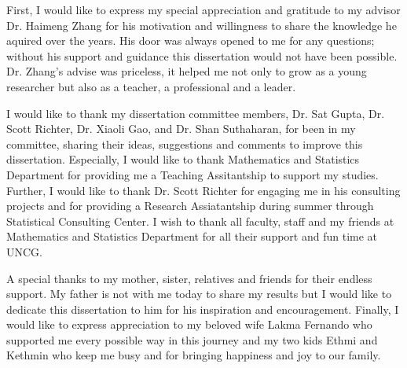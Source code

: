 %
%

First, I would like to express my special appreciation and gratitude to my advisor Dr. Haimeng Zhang for his motivation and willingness to share the knowledge he aquired over the years. His door was always opened to me for any questions; without his support and guidance this dissertation would not have been possible. Dr. Zhang's advise was priceless, it helped me not only to grow as a young researcher but also as a teacher, a professional and a leader. 

I would like to thank my dissertation committee members, Dr. Sat Gupta, Dr. Scott Richter, Dr. Xiaoli Gao, and Dr. Shan Suthaharan, for been in my committee, sharing their ideas, suggestions and comments to improve this dissertation. Especially, I would  like to thank Mathematics and Statistics Department for providing me a Teaching Assitantship to support my studies. Further, I would like to thank Dr. Scott Richter for engaging me in his consulting projects and for providing a Research Assiatantship during summer through Statistical Consulting Center. I wish to thank all faculty, staff and my friends at Mathematics and Statistics Department for all their support and fun time at UNCG.  

A special thanks to my mother, sister, relatives and friends for their endless support. My father is not with me today to share my results but I would like to dedicate this dissertation to him for his inspiration and encouragement. Finally, I would like to express appreciation to my beloved wife Lakma Fernando who supported me every possible way in this journey and my two kids Ethmi and Kethmin who keep me busy and for bringing happiness and joy to our family.    



%

